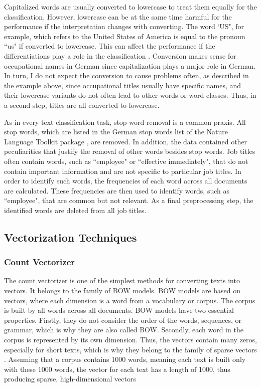 \documentclass[12pt, a4paper, titlepage]{article}
\begin{document}
Capitalized words are usually converted to lowercase to treat them equally for the classification. However, lowercase can be at the same time harmful for the performance if the interpretation changes with converting. The word `US", for example, which refers to the United States of America is equal to the pronoun ``us" if converted to lowercase. This can affect the performance if the differentiations play a role in the classification \citep{kowsari2019text}. Conversion makes sense for occupational names in German since capitalization plays a major role in German. In turn, I do not expect the conversion to cause problems often, as described in the example above, since occupational titles usually have specific names, and their lowercase variants do not often lead to other words or word classes. Thus, in a second step, titles are all converted to lowercase. 

As in every text classification task, stop word removal is a common praxis. All stop words, which are listed in the German stop words list of the Nature Language Toolkit package \citep{bird2009}, are removed. In addition, the data contained other peculiarities that justify the removal of other words besides stop words. Job titles often contain words, such as ``employee" or ``effective immediately", that do not contain important information and are not specific to particular job titles. In order to identify such words, the frequencies of each word across all documents are calculated. These frequencies are then used to identify words, such as ``employee", that are common but not relevant. As a final preprocessing step, the identified words are deleted from all job titles.  

\subsection{Vectorization Techniques}
\subsubsection*{Count Vectorizer}
The count vectorizer is one of the simplest methods for converting texts into vectors. It belongs to the family of \ac{BOW} models. \ac{BOW} models are based on vectors, where each dimension is a word from a vocabulary or corpus. The corpus is built by all words across all documents. \ac{BOW} models have two essential properties. Firstly, they do not consider the order of the words, sequences, or grammar, which is why they are also called \ac{BOW}. Secondly, each word in the corpus is represented by its own dimension. Thus, the vectors contain many zeros, especially for short texts, which is why they belong to the family of sparse vectors \citep{ajose2020}. Assuming that a corpus contains 1000 words, meaning each text is built only with these 1000 words, the vector for each text has a length of 1000, thus producing sparse, high-dimensional vectors \citep{kulkarni2021, sarkar2016}
\end{document}
